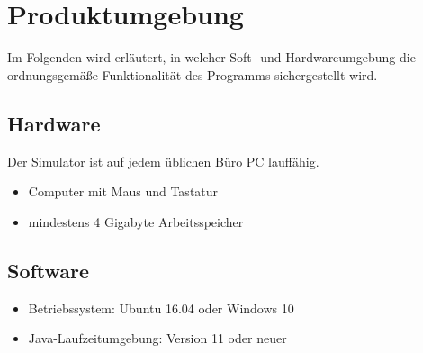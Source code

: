 \section{Produktumgebung}

Im Folgenden wird erläutert, in welcher Soft- und Hardwareumgebung die ordnungsgemäße Funktionalität des Programms sichergestellt wird.

\subsection{Hardware}
Der Simulator ist auf jedem üblichen Büro PC lauffähig.
\begin{itemize}
\item Computer mit Maus und Tastatur
\item mindestens 4 Gigabyte Arbeitsspeicher
\end{itemize}

\subsection{Software}
\begin{itemize}
\item Betriebssystem: Ubuntu 16.04 oder Windows 10
\item Java-Laufzeitumgebung: Version 11 oder neuer
\end{itemize}
